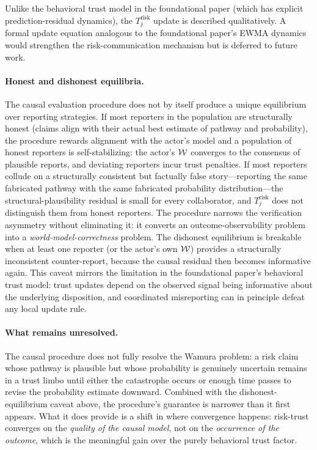 Unlike the behavioral trust model in the foundational paper (which has
explicit prediction-residual dynamics), the $T_j^{\mathrm{risk}}$ update
is described qualitatively. A formal update equation analogous to the
foundational paper's EWMA dynamics would strengthen the risk-communication
mechanism but is deferred to future work.

\paragraph{Honest and dishonest equilibria.} The causal evaluation
procedure does not by itself produce a unique equilibrium over reporting
strategies. If most reporters in the population are structurally honest
(claims align with their actual best estimate of pathway and probability),
the procedure rewards alignment with the actor's model and a population of
honest reporters is self-stabilizing: the actor's
$\mathcal{W}$ converges to the consensus of plausible reports, and
deviating reporters incur trust penalties. If most reporters
collude on a structurally consistent but factually false story---reporting
the same fabricated pathway with the same fabricated probability
distribution---the structural-plausibility residual is small for every
collaborator, and $T_j^{\mathrm{risk}}$ does not distinguish them from
honest reporters. The procedure narrows the verification asymmetry without
eliminating it: it converts an outcome-observability problem into a
\emph{world-model-correctness} problem. The dishonest equilibrium is
breakable when at least one reporter (or the actor's own
$\mathcal{W}$) provides a structurally inconsistent counter-report,
because the causal residual then becomes informative again. This caveat
mirrors the limitation in the foundational paper's behavioral trust model:
trust updates depend on the observed signal being informative about the
underlying disposition, and coordinated misreporting can in principle
defeat any local update rule.

\paragraph{What remains unresolved.} The causal procedure does not fully
resolve the Wamura problem: a risk claim whose pathway is plausible but
whose probability is genuinely uncertain remains in a trust limbo until
either the catastrophe occurs or enough time passes to revise the
probability estimate downward. Combined with the dishonest-equilibrium
caveat above, the procedure's guarantee is narrower than it first appears.
What it does provide is a shift in where convergence happens: risk-trust
converges on the \emph{quality of the causal model}, not on the
\emph{occurrence of the outcome}, which is the meaningful gain over the
purely behavioral trust factor.
